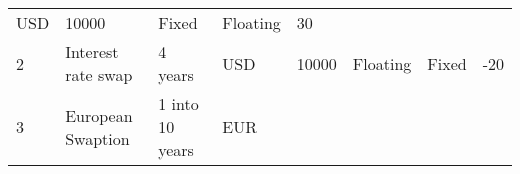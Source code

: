 \begin{longtable}[]{@{}llllllll@{}}
\begin{minipage}[t]{0.07\columnwidth}
USD\strut
\end{minipage} & \begin{minipage}[t]{0.11\columnwidth}\raggedright
10000\strut
\end{minipage} & \begin{minipage}[t]{0.11\columnwidth}\raggedright
Fixed\strut
\end{minipage} & \begin{minipage}[t]{0.13\columnwidth}\raggedright
Floating\strut
\end{minipage} & \begin{minipage}[t]{0.13\columnwidth}\raggedright
30\strut
\end{minipage}\tabularnewline
\begin{minipage}[t]{0.04\columnwidth}\raggedright
2\strut
\end{minipage} & \begin{minipage}[t]{0.10\columnwidth}\raggedright
Interest rate swap\strut
\end{minipage} & \begin{minipage}[t]{0.09\columnwidth}\raggedright
4 years\strut
\end{minipage} & \begin{minipage}[t]{0.07\columnwidth}\raggedright
USD\strut
\end{minipage} & \begin{minipage}[t]{0.11\columnwidth}\raggedright
10000\strut
\end{minipage} & \begin{minipage}[t]{0.11\columnwidth}\raggedright
Floating\strut
\end{minipage} & \begin{minipage}[t]{0.13\columnwidth}\raggedright
Fixed\strut
\end{minipage} & \begin{minipage}[t]{0.13\columnwidth}\raggedright
-20\strut
\end{minipage}\tabularnewline
\begin{minipage}[t]{0.04\columnwidth}\raggedright
3\strut
\end{minipage} & \begin{minipage}[t]{0.10\columnwidth}\raggedright
European Swaption\strut
\end{minipage} & \begin{minipage}[t]{0.09\columnwidth}\raggedright
1 into 10 years\strut
\end{minipage} & \begin{minipage}[t]{0.07\columnwidth}\raggedright
EUR\strut

\end{minipage}
\end{longtable}
